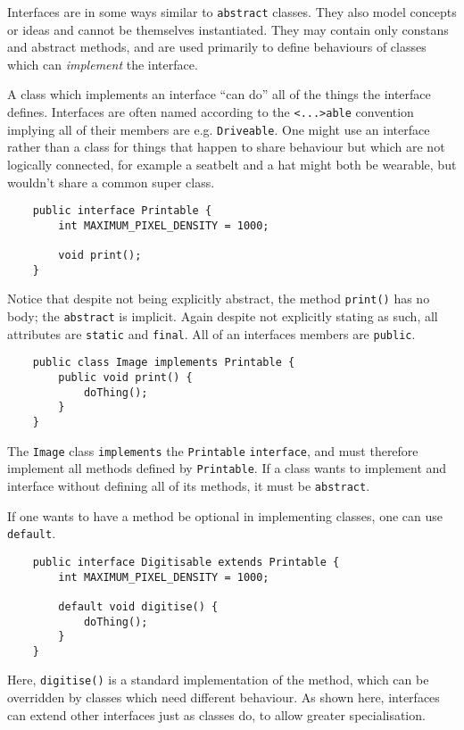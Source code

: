 \documentclass[12pt]{report}
\newcommand{\code}[1]{\lstinline{#1}}
\begin{document}
\begin{flushleft}
Interfaces are in some ways similar to \code{abstract} classes. They also model
concepts or ideas and cannot be themselves instantiated. They may contain only
constans and abstract methods, and are used primarily to define behaviours of
classes which can \textit{implement} the interface. \par
A class which implements an interface ``can do'' all of the things the
interface defines. Interfaces are often named according to the \code{<...>able}
convention implying all of their members are e.g. \code{Driveable}. One might
use an interface rather than a class for things that happen to share behaviour
but which are not logically connected, for example a seatbelt and a hat might
both be wearable, but wouldn't share a common super class.

\begin{lstlisting}
    public interface Printable {
        int MAXIMUM_PIXEL_DENSITY = 1000;

        void print();
    }
\end{lstlisting}

Notice that despite not being explicitly abstract, the method \code{print()}
has no body; the \code{abstract} is implicit. Again despite not explicitly
stating as such, all attributes are \code{static} and \code{final}. All of an
interfaces members are \code{public}.

\begin{lstlisting}
    public class Image implements Printable {
        public void print() {
            doThing();
        }
    }
\end{lstlisting}

The \code{Image} class \code{implements} the \code{Printable} \code{interface},
and must therefore implement all methods defined by \code{Printable}. If a
class wants to implement and interface without defining all of its methods, it
must be \code{abstract}. \par
If one wants to have a method be optional in implementing classes, one can use
\code{default}.

\begin{lstlisting}
    public interface Digitisable extends Printable {
        int MAXIMUM_PIXEL_DENSITY = 1000;

        default void digitise() {
            doThing();
        }
    }
\end{lstlisting}

Here, \code{digitise()} is a standard implementation of the method, which can
be overridden by classes which need different behaviour. As shown here,
interfaces can extend other interfaces just as classes do, to allow greater
specialisation.


\end{flushleft}
\end{document}
